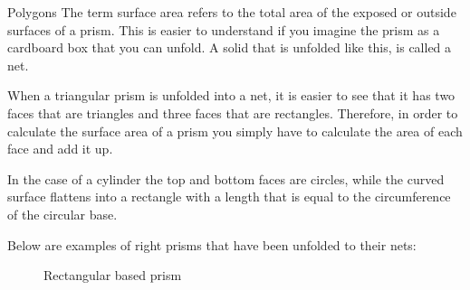 \begin{exercises}{Polygons}
 The term surface area refers to the total area of the exposed or outside surfaces of a prism.
This is easier to understand if you imagine the prism as a cardboard box that you can unfold.
A solid that is unfolded like this, is called a net.
\par 
 When a triangular prism is unfolded into a net, it is easier to see that it has two faces that are
triangles and three faces that are rectangles. Therefore, in order to calculate the surface area
of a prism you simply have to calculate the area of each face and add it up.
  \par
In the case of a cylinder the top and bottom faces are circles, while the curved surface flattens
into a rectangle with a length that is equal to the circumference of the circular base.

\par
Below are examples of right prisms that have been unfolded to their nets:

\begin{figure}[H]
 \caption{Rectangular based prism}
   \begin{center}





\end{center}
\end{figure}
\end{exercises}
